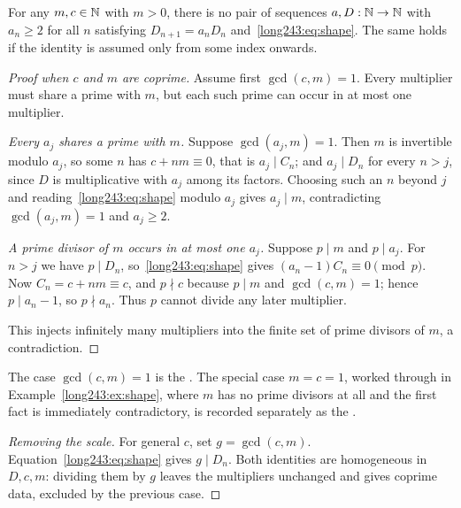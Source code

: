 \documentclass[11pt]{article}
\begin{document}
\begin{theorem}\label{long243:res:constant}
For any $m,c\in\mathbb{N}$ with $m>0$, there is no pair of sequences
$a,D:\mathbb{N}\to\mathbb{N}$ with $a_n\ge2$ for all $n$ satisfying
$D_{n+1}=a_nD_n$ and~\eqref{long243:eq:shape}. The same holds if the
identity is assumed only from some index onwards.
\end{theorem}

\begin{proof}[Proof when $c$ and $m$ are coprime]
Assume first $\gcd(c,m)=1$. Every multiplier must share a prime with
$m$, but each such prime can occur in at most one multiplier.

\emph{Every $a_j$ shares a prime with $m$.}  Suppose $\gcd(a_j,m)=1$.  Then
$m$ is invertible modulo $a_j$, so some $n$ has $c+nm\equiv0$, that is
$a_j\mid C_n$; and $a_j\mid D_n$ for every $n>j$, since $D$ is multiplicative
with $a_j$ among its factors.  Choosing such an $n$ beyond $j$
and reading~\eqref{long243:eq:shape} modulo $a_j$ gives $a_j\mid m$, contradicting
$\gcd(a_j,m)=1$ and $a_j\ge2$.

\emph{A prime divisor of $m$ occurs in at most one $a_j$.}  Suppose $p\mid m$
and $p\mid a_j$.  For $n>j$ we have $p\mid D_n$, so~\eqref{long243:eq:shape} gives
$(a_n-1)C_n\equiv0 \pmod p$.  Now $C_n=c+nm\equiv c$, and $p\nmid c$ because
$p\mid m$ and $\gcd(c,m)=1$; hence $p\mid a_n-1$, so $p\nmid a_n$.  Thus $p$
cannot divide any later multiplier.

This injects infinitely many multipliers into the finite set of prime
divisors of $m$, a contradiction.
\end{proof}

\noindent The case $\gcd(c,m)=1$ is the
.  The special case $m=c=1$, worked through in
Example~\ref{long243:ex:shape}, where $m$ has no prime divisors at all and the first
fact is immediately contradictory, is recorded separately as the
.

\begin{proof}[Removing the scale]
For general $c$, set $g=\gcd(c,m)$. Equation~\eqref{long243:eq:shape}
gives $g\mid D_n$. Both identities are homogeneous in $D,c,m$:
dividing them by $g$ leaves the multipliers unchanged and gives
coprime data, excluded by the previous case.
\end{proof}
\end{document}
